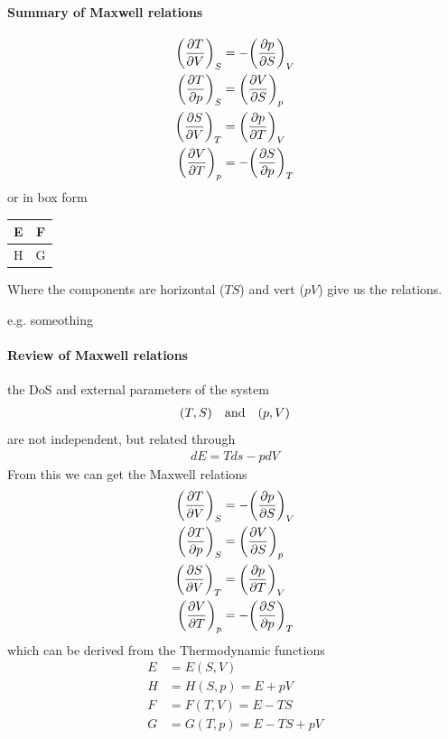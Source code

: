 \documentclass[../main.tex]{subfiles}
\begin{document}
\paragraph{Summary of Maxwell relations}
\begin{align*}
    \qt(\pdv{T}{V})_S &= -\qt(\pdv{p}{S})_V \\
    \qt(\pdv{T}{p})_S &= \qt(\pdv{V}{S})_p \\
    \qt(\pdv{S}{V})_T &= \qt(\pdv{p}{T})_V \\
    \qt(\pdv{V}{T})_p &= -\qt(\pdv{S}{p})_T
\end{align*}
or in box form
\begin{table}
    \centering
    \begin{tabular}{c|c}
        E & F \\ 
        \hline
        H & G
    \end{tabular}
\end{table}
Where the components are horizontal ($TS$) and vert ($pV$) give us the relations.

e.g. someothing

\newpage
{}

\paragraph{Review of Maxwell relations} the DoS and external parameters of the system
\begin{align*}
    (T,S) \qand (p,V)
\end{align*}
are not independent, but related through
\begin{align*}
    dE = T ds - pdV
\end{align*}
From this we can get the Maxwell relations
\begin{align*}
    \qt(\pdv{T}{V})_S &= -\qt(\pdv{p}{S})_V \\
    \qt(\pdv{T}{p})_S &= \qt(\pdv{V}{S})_p \\
    \qt(\pdv{S}{V})_T &= \qt(\pdv{p}{T})_V \\
    \qt(\pdv{V}{T})_p &= -\qt(\pdv{S}{p})_T
\end{align*}
which can be derived from the Thermodynamic functions
\begin{align*}
    E &= E(S,V) \\
    H &= H(S,p) = E + pV \\
    F &= F(T,V) = E - TS \\
    G &= G(T,p) = E - TS + pV
\end{align*}
\end{document}
